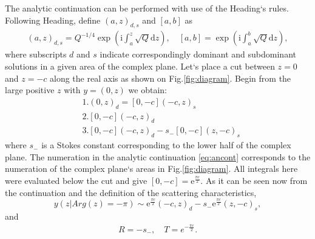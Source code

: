 \documentclass[aip,jmp,reprint]{revtex4-1}
\def\rmi{\mathrm{i}}
\def\rme{\mathrm{e}}
\def\rmd{\mathrm{d}}
\begin{document}
The analytic continuation can be performed with use of the Heading`s rules. 
Following Heading\cite{heading}, define $(a,z)_{d,s}$ and $[a,b]$ as
\begin{eqnarray}
(a,z)_{d,s} = Q^{-1/4}\exp \left( \rmi \int_a^z \sqrt{Q} \rmd z \right),
\quad
\left[a,b\right] = \exp \left( \rmi \int_a^b \sqrt{Q} \rmd z \right), 
\end{eqnarray}
where subscripts $d$ and $s$ indicate correspondingly dominant and subdominant solutions 
in a given area of the complex plane. Let`s place a cut between $z=0$ and $z=-c$ 
along the real axis as shown on Fig.\ref{fig:diagram}. Begin from the large positive $z$ 
with $y=(0,z)$ we obtain:
\begin{equation}
\begin{split} 
&1.(0,z)_d=[0,-c](-c,z)_s 
\\
&2.[0,-c](-c,z)_d 
\\
&3.[0,-c](-c,z)_d - s_-[0,-c](z,-c)_s
\label{eq:ancont}
\end{split}
\end{equation}
where $s_-$ is a Stokes constant corresponding to the lower half of the complex plane.
The numeration in the analytic continuation \eqref{eq:ancont} corresponds to the
numeration of the complex plane`s areas in Fig.\ref{fig:diagram}.
All integrals here were evaluated below the cut and give $[0,-c]=\rme^{\frac{\pi c}{2}}$. As it
can be seen now from the continuation and the definition of the scattering characteristics,
\begin{equation}
y(z | Arg(z) = -\pi) \sim \rme^{\frac{\pi c}{2}}(-c,z)_d - s_-\rme^{\frac{\pi c}{2}}(z,-c)_s,
\end{equation}
and
\begin{eqnarray}
R = -s_-, \quad T = e^{-\frac{\pi c}{2}}.
\label{eq:scattr}
\end{eqnarray}
\end{document}
